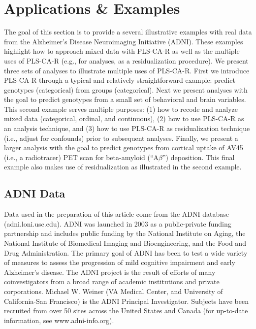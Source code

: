 \documentclass[12pt]{article}
\begin{document}
\hypertarget{applications-examples}{%
\section{Applications \& Examples}\label{applications-examples}}

\label{section:appex}

The goal of this section is to provide a several illustrative examples
with real data from the Alzheimer's Disease Neuroimaging Initiative
(ADNI). These examples highlight how to approach mixed data with
PLS-CA-R as well as the multiple uses of PLS-CA-R (e.g., for analyses,
as a residualization procedure). We present three sets of analyses to
illustrate multiple uses of PLS-CA-R. First we introduce PLS-CA-R
through a typical and relatively straightforward example: predict
genotypes (categorical) from groups (categorical). Next we present
analyses with the goal to predict genotypes from a small set of
behavioral and brain variables. This second example serves multiple
purposes: (1) how to recode and analyze mixed data (categorical,
ordinal, and continuous), (2) how to use PLS-CA-R as an analysis
technique, and (3) how to use PLS-CA-R as residualization technique
(i.e., adjust for confounds) prior to subsequent analyses. Finally, we
present a larger analysis with the goal to predict genotypes from
cortical uptake of AV45 (i.e., a radiotracer) PET scan for beta-amyloid
(``A\(\beta\)'') deposition. This final example also makes use of
residualization as illustrated in the second example.

\hypertarget{adni-data}{%
\subsection{ADNI Data}\label{adni-data}}

\label{section:data}

Data used in the preparation of this article come from the ADNI database
(adni.loni.usc.edu). ADNI was launched in 2003 as a public-private
funding partnership and includes public funding by the National
Institute on Aging, the National Institute of Biomedical Imaging and
Bioengineering, and the Food and Drug Administration. The primary goal
of ADNI has been to test a wide variety of measures to assess the
progression of mild cognitive impairment and early Alzheimer's disease.
The ADNI project is the result of efforts of many coinvestigators from a
broad range of academic institutions and private corporations. Michael
W. Weiner (VA Medical Center, and University of California-San
Francisco) is the ADNI Principal Investigator. Subjects have been
recruited from over 50 sites across the United States and Canada (for
up-to-date information, see www.adni-info.org).
\end{document}
